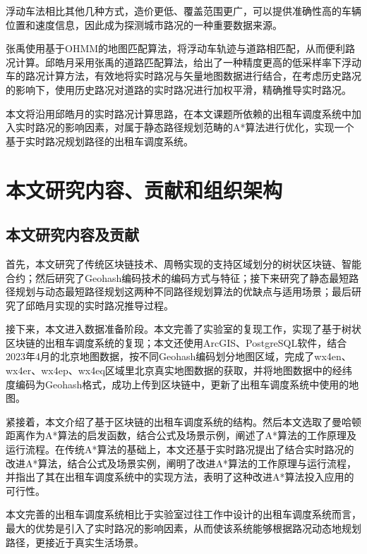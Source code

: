 浮动车法相比其他几种方式，造价更低、覆盖范围更广，可以提供准确性高的车辆位置和速度信息，因此成为探测城市路况的一种重要数据来源\cite{孙卫真2019低采样率浮动车的路况计算精度优化}。

张禹\cite{张禹基于车辆轨迹的动态路况挖掘}使用基于OHMM的地图匹配算法，将浮动车轨迹与道路相匹配，从而便利路况计算。邱皓月\cite{孙卫真2019低采样率浮动车的路况计算精度优化}采用张禹的道路匹配算法，给出了一种精度更高的低采样率下浮动车的路况计算方法，有效地将实时路况与矢量地图数据进行结合，在考虑历史路况的影响下，使用历史路况对道路的实时路况进行加权平滑，精确推导实时路况。

本文将沿用邱皓月的实时路况计算思路，在本文课题所依赖的出租车调度系统中加入实时路况的影响因素，对属于静态路径规划范畴的A*算法进行优化，实现一个基于实时路况规划路径的出租车调度系统。

\section{本文研究内容、贡献和组织架构}

\subsection{本文研究内容及贡献}

首先，本文研究了传统区块链技术、周畅\cite{s22228885}实现的支持区域划分的树状区块链、智能合约；然后研究了Geohash编码技术的编码方式与特征；接下来研究了静态最短路径规划与动态最短路径规划这两种不同路径规划算法的优缺点与适用场景；最后研究了邱皓月\cite{孙卫真2019低采样率浮动车的路况计算精度优化}实现的实时路况推导过程。

接下来，本文进入数据准备阶段。本文完善了实验室的复现工作，实现了基于树状区块链的出租车调度系统的复现；本文还使用ArcGIS、PostgreSQL软件，结合2023年4月的北京地图数据，按不同Geohash编码划分地图区域，完成了wx4en、wx4er、wx4ep、wx4eq区域里北京真实地图数据的获取，并将地图数据中的经纬度编码为Geohash格式，成功上传到区块链中，更新了出租车调度系统中使用的地图。

紧接着，本文介绍了基于区块链的出租车调度系统的结构。然后本文选取了曼哈顿距离作为A*算法的启发函数，结合公式及场景示例，阐述了A*算法的工作原理及运行流程。在传统A*算法的基础上，本文还基于实时路况提出了结合实时路况的改进A*算法，结合公式及场景实例，阐明了改进A*算法的工作原理与运行流程，并指出了其在出租车调度系统中的实现方法，表明了这种改进A*算法投入应用的可行性。

本文完善的出租车调度系统相比于实验室过往工作中设计的出租车调度系统而言，最大的优势是引入了实时路况的影响因素，从而使该系统能够根据路况动态地规划路径，更接近于真实生活场景。

